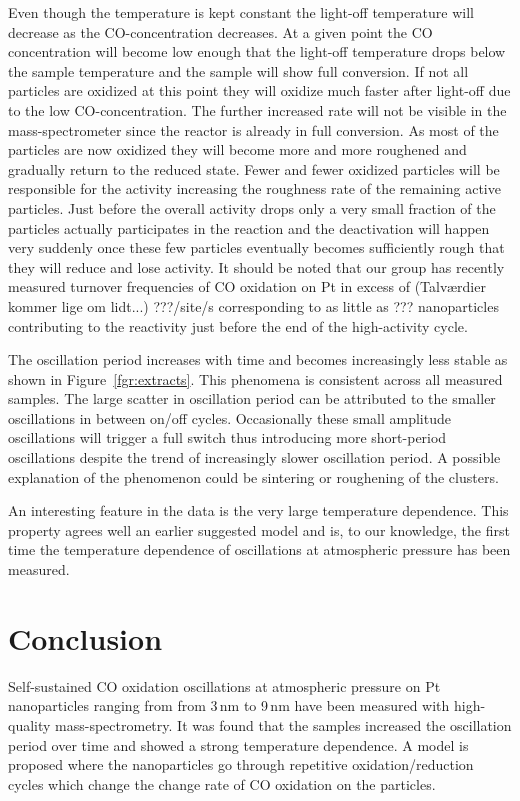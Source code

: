 \documentclass[8.5pt,twoside,twocolumn]{article}
\begin{document}
Even though the temperature is kept constant the light-off temperature will decrease as the CO-concentration decreases. At a given point the CO concentration will become low enough that the light-off temperature drops below the sample temperature and the sample will show full conversion. If not all particles are oxidized at this point they will oxidize much faster after light-off due to the low CO-concentration. The further increased rate will not be visible in the mass-spectrometer since the reactor is already in full conversion. As most of the particles are now oxidized they will become more and more roughened and gradually return to the reduced state. Fewer and fewer oxidized particles will be responsible for the activity increasing the roughness rate of the remaining active particles. Just before the overall activity drops only a very small fraction of the particles actually participates in the reaction and the deactivation will happen very suddenly once these few particles eventually becomes sufficiently rough that they will reduce and lose activity. It should be noted that our group has recently measured turnover frequencies of CO oxidation on Pt in excess of (Talværdier kommer lige om lidt...) ???/site/s corresponding to as little as ??? nanoparticles contributing to the reactivity just before the end of the high-activity cycle.

The oscillation period increases with time and becomes increasingly less stable as shown in Figure~\ref{fgr:extracts}. This phenomena is consistent across all measured samples. The large scatter in oscillation period can be attributed to the smaller oscillations in between on/off cycles. Occasionally these small amplitude oscillations will trigger a full switch thus introducing more short-period oscillations despite the trend of increasingly slower oscillation period. A possible explanation of the phenomenon could be sintering or roughening of the clusters.

An interesting feature in the data is the very large temperature dependence. This property agrees well an earlier suggested model \cite{Hendriksen2010} and is, to our knowledge, the first time the temperature dependence of oscillations at atmospheric pressure has been measured.

\section{Conclusion}
Self-sustained CO oxidation oscillations at atmospheric pressure on Pt nanoparticles ranging from from 3\,nm to 9\,nm have been measured with high-quality mass-spectrometry. It was found that the samples increased the oscillation period over time and showed a strong temperature dependence. A model is proposed where the nanoparticles go through repetitive oxidation/reduction cycles which change the change rate of CO oxidation on the particles. 
\end{document}

